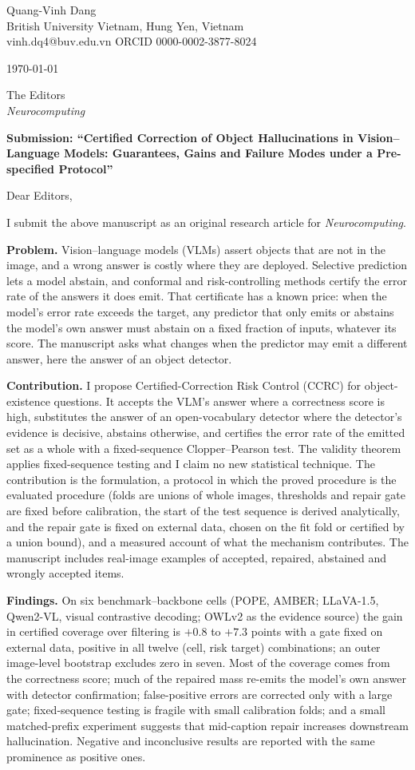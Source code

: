 \documentclass[10.5pt,a4paper]{article}
\begin{document}
Quang-Vinh Dang\\
British University Vietnam, Hung Yen, Vietnam\\
vinh.dq4@buv.edu.vn \quad ORCID 0000-0002-3877-8024

\today

The Editors\\
\emph{Neurocomputing}

\textbf{Submission: ``Certified Correction of Object Hallucinations in Vision--Language Models: Guarantees, Gains and Failure Modes under a Pre-specified Protocol''}

Dear Editors,

I submit the above manuscript as an original research article for \emph{Neurocomputing}.

\textbf{Problem.} Vision--language models (VLMs) assert objects that are not in the image, and a wrong answer is costly where they are deployed. Selective prediction lets a model abstain,
and conformal and risk-controlling methods certify the error rate of the answers it does emit. That certificate has a known price: when the model's error rate exceeds the target, any predictor that only emits
or abstains the model's own answer must abstain on a fixed fraction of inputs, whatever its score. The manuscript asks what changes when the predictor may emit a different answer, here the answer of an object detector.

\textbf{Contribution.} I propose Certified-Correction Risk Control (CCRC) for object-existence questions. It accepts the VLM's answer where a correctness score is high, substitutes the answer of an
open-vocabulary detector where the detector's evidence is decisive, abstains otherwise, and certifies the error rate of the emitted set as a whole with a fixed-sequence Clopper--Pearson test. The validity theorem
applies fixed-sequence testing and I claim no new statistical technique. The contribution is the formulation, a protocol in which the proved procedure is the evaluated procedure (folds are unions of whole images, thresholds and repair gate are fixed
before calibration, the start of the test sequence is derived analytically, and the repair gate is fixed on external data, chosen on the fit fold or certified by a union bound), and a measured account of what the mechanism contributes.
The manuscript includes real-image examples of accepted, repaired, abstained and wrongly accepted items.

\textbf{Findings.} On six benchmark--backbone cells (POPE, AMBER; LLaVA-1.5, Qwen2-VL, visual contrastive decoding; OWLv2 as the evidence source) the gain in certified coverage over filtering is $+0.8$ to $+7.3$ points with a gate fixed on external data,
positive in all twelve (cell, risk target) combinations; an outer image-level bootstrap excludes zero in seven. Most of the coverage comes from the correctness score; much of the repaired mass re-emits the model's own answer with detector confirmation;
false-positive errors are corrected only with a large gate; fixed-sequence testing is fragile with small calibration folds; and a small matched-prefix experiment suggests that mid-caption repair increases downstream hallucination.
Negative and inconclusive results are reported with the same prominence as positive ones.
\end{document}
